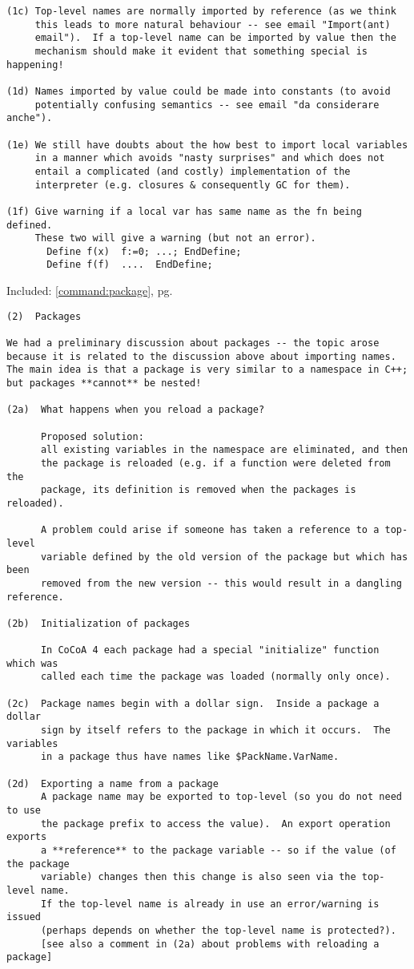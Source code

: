 \documentclass{book}[12,a4paper]
\def\refandpage#1{{\ref{#1}, pg.\pageref{#1}}}
\begin{document}
\begin{verbatim}
(1c) Top-level names are normally imported by reference (as we think
     this leads to more natural behaviour -- see email "Import(ant)
     email").  If a top-level name can be imported by value then the
     mechanism should make it evident that something special is happening!

(1d) Names imported by value could be made into constants (to avoid
     potentially confusing semantics -- see email "da considerare anche").

(1e) We still have doubts about the how best to import local variables
     in a manner which avoids "nasty surprises" and which does not
     entail a complicated (and costly) implementation of the
     interpreter (e.g. closures & consequently GC for them).

(1f) Give warning if a local var has same name as the fn being defined.
     These two will give a warning (but not an error).
       Define f(x)  f:=0; ...; EndDefine;
       Define f(f)  ....  EndDefine;
\end{verbatim}

Included: \refandpage{command:package}
\begin{verbatim}
(2)  Packages

We had a preliminary discussion about packages -- the topic arose
because it is related to the discussion above about importing names.
The main idea is that a package is very similar to a namespace in C++;
but packages **cannot** be nested!

(2a)  What happens when you reload a package?

      Proposed solution:
      all existing variables in the namespace are eliminated, and then
      the package is reloaded (e.g. if a function were deleted from the
      package, its definition is removed when the packages is reloaded).

      A problem could arise if someone has taken a reference to a top-level
      variable defined by the old version of the package but which has been
      removed from the new version -- this would result in a dangling reference.

(2b)  Initialization of packages

      In CoCoA 4 each package had a special "initialize" function which was
      called each time the package was loaded (normally only once).

(2c)  Package names begin with a dollar sign.  Inside a package a dollar
      sign by itself refers to the package in which it occurs.  The variables
      in a package thus have names like $PackName.VarName.

(2d)  Exporting a name from a package
      A package name may be exported to top-level (so you do not need to use
      the package prefix to access the value).  An export operation exports
      a **reference** to the package variable -- so if the value (of the package
      variable) changes then this change is also seen via the top-level name.
      If the top-level name is already in use an error/warning is issued
      (perhaps depends on whether the top-level name is protected?).
      [see also a comment in (2a) about problems with reloading a package]
\end{verbatim}
\end{document}

